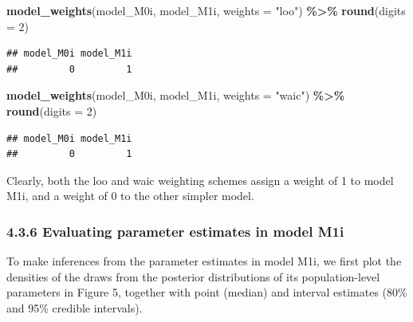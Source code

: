 \documentclass[
  man, donotrepeattitle,floatsintext]{apa6}
\newenvironment{Shaded}{\begin{snugshade}}{\end{snugshade}}
\newcommand{\AttributeTok}[1]{\textcolor[rgb]{0.13,0.29,0.53}{#1}}
\newcommand{\DecValTok}[1]{\textcolor[rgb]{0.00,0.00,0.81}{#1}}
\newcommand{\FunctionTok}[1]{\textcolor[rgb]{0.13,0.29,0.53}{\textbf{#1}}}
\newcommand{\NormalTok}[1]{#1}
\newcommand{\SpecialCharTok}[1]{\textcolor[rgb]{0.81,0.36,0.00}{\textbf{#1}}}
\newcommand{\StringTok}[1]{\textcolor[rgb]{0.31,0.60,0.02}{#1}}
\begin{document}
\footnotesize

\begin{Shaded}
\begin{Highlighting}[]
\FunctionTok{model\_weights}\NormalTok{(model\_M0i, model\_M1i, }\AttributeTok{weights =} \StringTok{"loo"}\NormalTok{) }\SpecialCharTok{\%\textgreater{}\%} \FunctionTok{round}\NormalTok{(}\AttributeTok{digits =} \DecValTok{2}\NormalTok{)}
\end{Highlighting}
\end{Shaded}

\begin{verbatim}
## model_M0i model_M1i 
##         0         1
\end{verbatim}

\begin{Shaded}
\begin{Highlighting}[]
\FunctionTok{model\_weights}\NormalTok{(model\_M0i, model\_M1i, }\AttributeTok{weights =} \StringTok{"waic"}\NormalTok{) }\SpecialCharTok{\%\textgreater{}\%} \FunctionTok{round}\NormalTok{(}\AttributeTok{digits =} \DecValTok{2}\NormalTok{) }
\end{Highlighting}
\end{Shaded}

\begin{verbatim}
## model_M0i model_M1i 
##         0         1
\end{verbatim}

\normalsize

Clearly, both the loo and waic weighting schemes assign a weight of 1 to model M1i, and a weight of 0 to the other simpler model.

\subsubsection{4.3.6 Evaluating parameter estimates in model M1i}\label{evaluating-parameter-estimates-in-model-m1i}

To make inferences from the parameter estimates in model M1i, we first plot the densities of the draws from the posterior distributions of its population-level parameters in Figure 5, together with point (median) and interval estimates (80\% and 95\% credible intervals).
\end{document}
